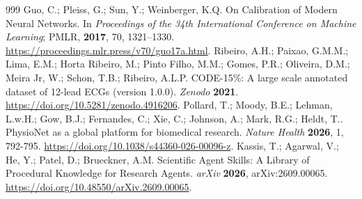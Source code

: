 \documentclass[life,article,submit,moreauthors]{Definitions/mdpi}
\begin{document}
\begin{thebibliography}{999}
Guo, C.; Pleiss, G.; Sun, Y.; Weinberger, K.Q. On Calibration of Modern Neural Networks. In \emph{Proceedings of the 34th International Conference on Machine Learning}; PMLR, \textbf{2017}, 70, 1321--1330. \url{https://proceedings.mlr.press/v70/guo17a.html}.
Ribeiro, A.H.; Paixao, G.M.M.; Lima, E.M.; Horta Ribeiro, M.; Pinto Filho, M.M.; Gomes, P.R.; Oliveira, D.M.; Meira Jr, W.; Schon, T.B.; Ribeiro, A.L.P. CODE-15\%: A large scale annotated dataset of 12-lead ECGs (version 1.0.0). \emph{Zenodo} \textbf{2021}. \url{https://doi.org/10.5281/zenodo.4916206}.
Pollard, T.; Moody, B.E.; Lehman, L.w.H.; Gow, B.J.; Fernandes, C.; Xie, C.; Johnson, A.; Mark, R.G.; Heldt, T.. PhysioNet as a global platform for biomedical research. \emph{Nature Health} \textbf{2026}, 1, 792-795. \url{https://doi.org/10.1038/s44360-026-00096-z}.
Kassis, T.; Agarwal, V.; He, Y.; Patel, D.; Brueckner, A.M. Scientific Agent Skills: A Library of Procedural Knowledge for Research Agents. \emph{arXiv} \textbf{2026}, arXiv:2609.00065. \url{https://doi.org/10.48550/arXiv.2609.00065}.
\end{thebibliography}
\end{document}
